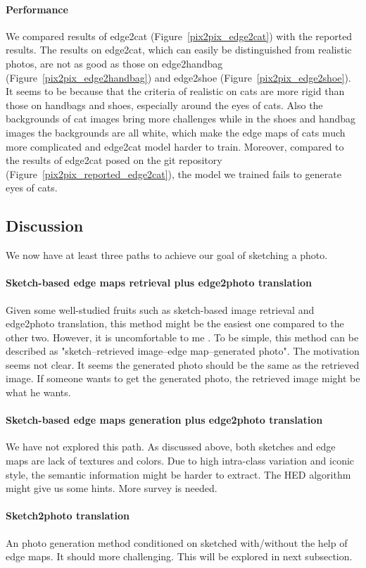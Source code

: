 \paragraph{Performance}
We compared results of edge2cat (Figure~\ref{pix2pix_edge2cat}) with the reported results. The results on edge2cat, which can easily be distinguished from realistic photos, are not as good as those on edge2handbag (Figure~\ref{pix2pix_edge2handbag}) and edge2shoe (Figure~\ref{pix2pix_edge2shoe}). It seems to be because that the criteria of realistic on cats are more rigid than those on handbags and shoes, especially around the eyes of cats. Also the backgrounds of cat images bring more challenges while in the shoes and handbag images the backgrounds are all white, which make the edge maps of cats much more complicated and edge2cat model harder to train. Moreover, compared to the results of edge2cat posed on the git repository (Figure~\ref{pix2pix_reported_edge2cat}), the model we trained fails to generate eyes of cats. 
\subsection{Discussion}
We now have at least three paths to achieve our goal of sketching a photo. 
\paragraph{Sketch-based edge maps retrieval plus edge2photo translation}
Given some well-studied fruits such as sketch-based image retrieval and edge2photo translation, this method might be the easiest one compared to the other two. However, it is uncomfortable to me .
To be simple, this method can be described as "sketch--retrieved image--edge map--generated photo". 
The motivation seems not clear. It seems the generated photo should be the same as the retrieved image. If someone wants to get the generated photo, the retrieved image might be what he wants. 
\paragraph{Sketch-based edge maps generation plus edge2photo translation}
We have not explored this path. As discussed above, both sketches and edge maps are lack of textures and colors. Due to high intra-class variation and iconic style, the semantic information might be harder to extract. The HED algorithm might give us some hints. More survey is needed.
\paragraph{Sketch2photo translation}
An photo generation method conditioned on sketched with/without the help of edge maps. It should more challenging. This will be explored in next subsection.



